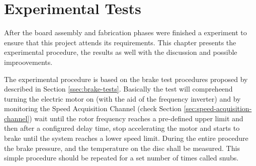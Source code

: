 \chapter{Experimental Tests}\label{ch:experimentalTests}
		After the board assembly and fabrication phases were finished a experiment to ensure that this project attends its requirements. This chapter presents the experimental procedure, the results as well with the discussion and possible improovements.
		\par
		The experimental procedure is based on the brake test procedures proposed by \cite{saej2522} described in Section \ref{ssec:brake-tests}. Basically the test will compreheend turning the electric motor on (with the aid of the frequency inverter) and by monitoring the Speed Acquisition Channel (check Section \ref{sec:speed-acquisition-channel}) wait until the rotor frequency reaches a pre-defined upper limit and then after a configured delay time, stop accelerating the motor and starts to brake until the system reaches a lower speed limit. During the entire procedure the brake pressure, and the temperature on the disc shall be measured. This simple procedure should be repeated for a set number of times called snubs. 

		
		
		